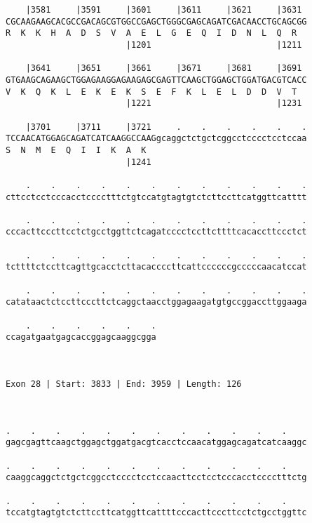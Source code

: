 \documentclass{article}
\begin{document}
\begin{Verbatim}
    |3581     |3591     |3601     |3611     |3621     |3631 
CGCAAGAAGCACGCCGACAGCGTGGCCGAGCTGGGCGAGCAGATCGACAACCTGCAGCGG
R  K  K  H  A  D  S  V  A  E  L  G  E  Q  I  D  N  L  Q  R  
                        |1201                         |1211 
  
    |3641     |3651     |3661     |3671     |3681     |3691 
GTGAAGCAGAAGCTGGAGAAGGAGAAGAGCGAGTTCAAGCTGGAGCTGGATGACGTCACC
V  K  Q  K  L  E  K  E  K  S  E  F  K  L  E  L  D  D  V  T  
                        |1221                         |1231 
  
    |3701     |3711     |3721     .    .    .    .    .    .
TCCAACATGGAGCAGATCATCAAGGCCAAGgcaggctctgctcggcctcccctcctccaa
S  N  M  E  Q  I  I  K  A  K                                
                        |1241                               
  
    .    .    .    .    .    .    .    .    .    .    .    .
cttcctcctcccacctcccctttctgtccatgtagtgtctcttccttcatggttcatttt
                                                            
    .    .    .    .    .    .    .    .    .    .    .    .
cccacttcccttcctctgcctggttctcagatcccctccttcttttcacaccttccctct
                                                            
    .    .    .    .    .    .    .    .    .    .    .    .
tcttttctccttcagttgcacctcttacaccccttcattccccccgcccccaacatccat
                                                            
    .    .    .    .    .    .    .    .    .    .    .    .
catataactctccttcccttctcaggctaacctggagaagatgtgccggaccttggaaga
                                                            
    .    .    .    .    .    .
ccagatgaatgagcaccggagcaaggcgga
                              
                              
 
Exon 28 | Start: 3833 | End: 3959 | Length: 126



.    .    .    .    .    .    .    .    .    .    .    .    
gagcgagttcaagctggagctggatgacgtcacctccaacatggagcagatcatcaaggc
                                                            
.    .    .    .    .    .    .    .    .    .    .    .    
caaggcaggctctgctcggcctcccctcctccaacttcctcctcccacctcccctttctg
                                                            
.    .    .    .    .    .    .    .    .    .    .    .    
tccatgtagtgtctcttccttcatggttcattttcccacttcccttcctctgcctggttc
                                                            

\end{Verbatim}
\end{document}
